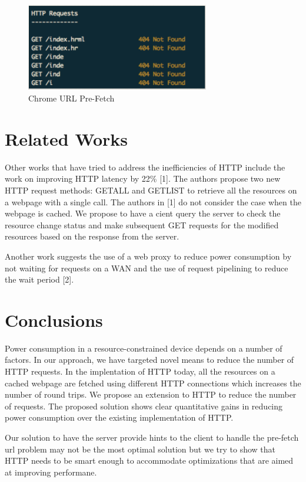\documentclass{sigplanconf}
\begin{document}
\begin{figure}[ht!]
\centering
\includegraphics[width=80mm]{chrome}
\caption{Chrome URL Pre-Fetch}
\label{fig:sp_gd_mnist}
\end{figure}

\section{ Related Works}

Other works that have tried to address the inefficiencies of HTTP include the work on improving HTTP latency by 22\% [1]. The authors propose two new HTTP request methods: GETALL and GETLIST to retrieve all the resources on a webpage with a single call. The authors in [1] do not consider the case when the webpage is cached. We propose to have a cient query the server to check the resource change status and make subsequent GET requests for the modified resources based on the response from the server.

Another work suggests the use of a web proxy to reduce power consumption by not waiting for requests on a WAN and the use of request pipelining to reduce the wait period [2].

\section{Conclusions}

Power consumption in a resource-constrained device depends on a number of factors. In our approach, we have targeted novel means to reduce the number of HTTP requests. In the implentation of HTTP today, all the resources on a cached webpage are fetched using different HTTP connections which increases the number of round trips. We propose an extension to HTTP to reduce the number of requests. The proposed solution shows clear quantitative gains in reducing power consumption over the existing implementation of HTTP. 

Our solution to have the server provide hints to the client to handle the pre-fetch url problem may not be the most optimal solution but we try to show that HTTP needs to be smart enough 	to accommodate optimizations that are aimed at improving performane.
\end{document}

